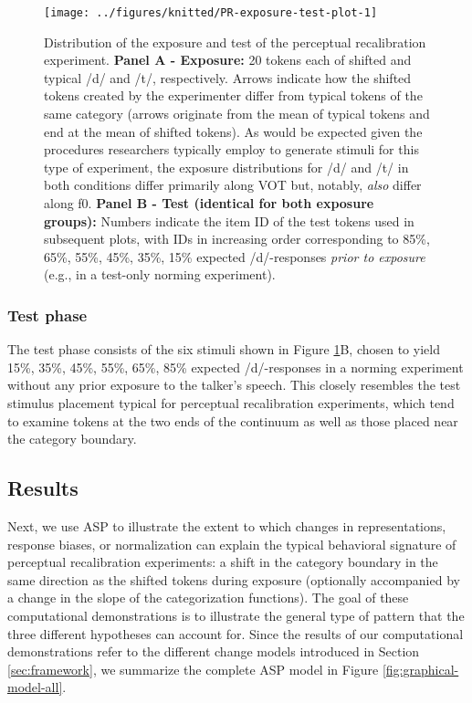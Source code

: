 \documentclass[
  11pt,
  man,floatsintext]{apa6}
\begin{document}
\begin{figure}

{\centering \texttt{[image: ../figures/knitted/PR-exposure-test-plot-1]} 

}

\caption{Distribution of the exposure and test of the perceptual recalibration experiment. \textbf{Panel A - Exposure:} 20 tokens each of shifted and typical /d/ and /t/, respectively. Arrows indicate how the shifted tokens created by the experimenter differ from typical tokens of the same category (arrows originate from the mean of typical tokens and end at the mean of shifted tokens). As would be expected given the procedures researchers typically employ to generate stimuli for this type of experiment, the exposure distributions for /d/ and /t/ in both conditions differ primarily along VOT but, notably, \emph{also} differ along f0. \textbf{Panel B - Test (identical for both exposure groups):} Numbers indicate the item ID of the test tokens used in subsequent plots, with IDs in increasing order corresponding to 85\%, 65\%, 55\%, 45\%, 35\%, 15\% expected /d/-responses \emph{prior to exposure} (e.g., in a test-only norming experiment).}\label{fig:PR-exposure-test-plot}
\end{figure}

\hypertarget{test-phase}{%
\subsubsection{Test phase}\label{test-phase}}

The test phase consists of the six stimuli shown in Figure \ref{fig:PR-exposure-test-plot}B, chosen to yield 15\%, 35\%, 45\%, 55\%, 65\%, 85\% expected /d/-responses in a norming experiment without any prior exposure to the talker's speech. This closely resembles the test stimulus placement typical for perceptual recalibration experiments, which tend to examine tokens at the two ends of the continuum as well as those placed near the category boundary.

\hypertarget{results}{%
\subsection{Results}\label{results}}

Next, we use ASP to illustrate the extent to which changes in representations, response biases, or normalization can explain the typical behavioral signature of perceptual recalibration experiments: a shift in the category boundary in the same direction as the shifted tokens during exposure (optionally accompanied by a change in the slope of the categorization functions). The goal of these computational demonstrations is to illustrate the general type of pattern that the three different hypotheses can account for. Since the results of our computational demonstrations refer to the different change models introduced in Section \ref{sec:framework}, we summarize the complete ASP model in Figure \ref{fig:graphical-model-all}.
\end{document}
